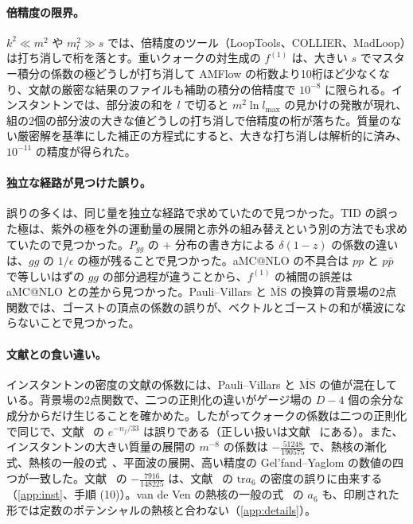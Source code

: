 \documentclass[a4paper,10pt]{ltjsarticle}
\newcommand{\MSbar}{\overline{\mathrm{MS}}}
\newcommand{\tr}{\mathrm{tr}}
\begin{document}
\paragraph{倍精度の限界。}$k^2\ll m^2$ や $m_t^2\gg s$ では、倍精度のツール（LoopTools、COLLIER、MadLoop）は打ち消しで桁を落とす。重いクォークの対生成の $f^{(1)}$ は、大きい $s$ でマスター積分の係数の極どうしが打ち消して AMFlow の桁数より10桁ほど少なくなり、文献の厳密な結果のファイルも補助の積分の倍精度で $10^{-8}$ に限られる。インスタントンでは、部分波の和を $l$ で切ると $m^2\ln l_{\max}$ の見かけの発散が現れ、組の2個の部分波の大きな値どうしの打ち消しで倍精度の桁が落ちた。質量のない厳密解を基準にした補正の方程式にすると、大きな打ち消しは解析的に済み、$10^{-11}$ の精度が得られた。

\paragraph{独立な経路が見つけた誤り。}誤りの多くは、同じ量を独立な経路で求めていたので見つかった。TID の誤った極は、紫外の極を外の運動量の展開と赤外の組み替えという別の方法でも求めていたので見つかった。$P_{gg}$ の $+$ 分布の書き方による $\delta(1-z)$ の係数の違いは、$gg$ の $1/\epsilon$ の極が残ることで見つかった。aMC@NLO の不具合は $pp$ と $p\bar p$ で等しいはずの $gg$ の部分過程が違うことから、$f^{(1)}$ の補間の誤差は aMC@NLO との差から見つかった。Pauli--Villars と $\MSbar$ の換算の背景場の2点関数では、ゴーストの頂点の係数の誤りが、ベクトルとゴーストの和が横波にならないことで見つかった。

\paragraph{文献との食い違い。}インスタントンの密度の文献の係数には、Pauli--Villars と $\MSbar$ の値が混在している。背景場の2点関数で、二つの正則化の違いがゲージ場の $D-4$ 個の余分な成分からだけ生じることを確かめた。したがってクォークの係数は二つの正則化で同じで、文献~\cite{bn20,fm25} の $e^{-n_f/33}$ は誤りである（正しい扱いは文献~\cite{hh81,thooft86,np94} にある）。また、インスタントンの大きい質量の展開の $m^{-8}$ の係数は $-\frac{51248}{190575}$ で、熱核の漸化式、熱核の一般の式~\cite{fhss98}、平面波の展開、高い精度の Gel'fand--Yaglom の数値の四つが一致した。文献~\cite{klm00,dhlm05b} の $-\frac{7916}{148225}$ は、文献~\cite{klm00} の $\tr a_6$ の密度の誤りに由来する（\ref{app:inst}、手順 (10)）。van de Ven の熱核の一般の式~\cite{vdv98} の $a_6$ も、印刷された形では定数のポテンシャルの熱核と合わない（\ref{app:details}）。
\end{document}
